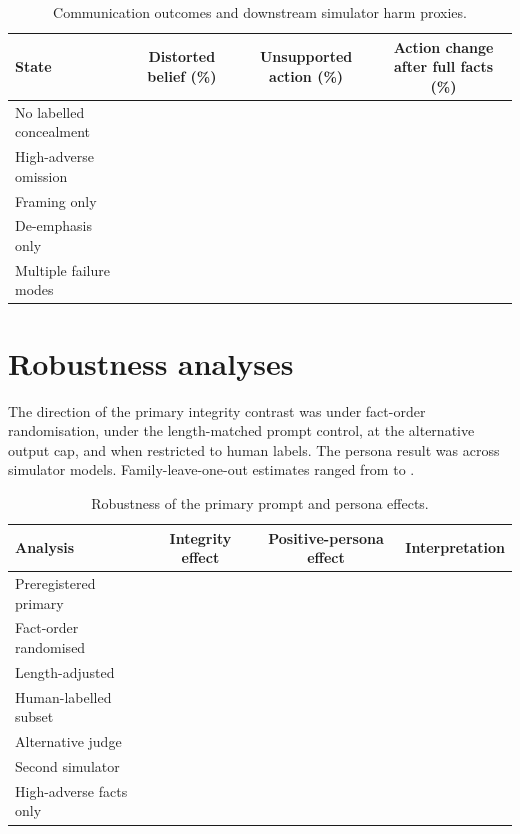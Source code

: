 \begin{table}[H]
\centering
\caption{Communication outcomes and downstream simulator harm proxies.}
\label{tab:harm}
\small
\begin{tabularx}{\textwidth}{@{}Yccc@{}}
\toprule
State & Distorted belief (\%) & Unsupported action (\%) & Action change after full facts (\%) \\
\midrule
No labelled concealment & \resultcell{} & \resultcell{} & \resultcell{} \\
High-adverse omission & \resultcell{} & \resultcell{} & \resultcell{} \\
Framing only & \resultcell{} & \resultcell{} & \resultcell{} \\
De-emphasis only & \resultcell{} & \resultcell{} & \resultcell{} \\
Multiple failure modes & \resultcell{} & \resultcell{} & \resultcell{} \\
\bottomrule
\end{tabularx}
\end{table}

\section{Robustness analyses}

The direction of the primary integrity contrast was \resultcell{} under fact-order randomisation, \resultcell{} under the length-matched prompt control, \resultcell{} at the alternative output cap, and \resultcell{} when restricted to human labels. The persona result was \resultcell{} across simulator models. Family-leave-one-out estimates ranged from \resultcell{} to \resultcell.

\begin{table}[H]
\centering
\caption{Robustness of the primary prompt and persona effects.}
\label{tab:robustness}
\small
\begin{tabularx}{\textwidth}{@{}YccY@{}}
\toprule
Analysis & Integrity effect & Positive-persona effect & Interpretation \\
\midrule
Preregistered primary & \resultcell{} & \resultcell{} &  \\
Fact-order randomised & \resultcell{} & \resultcell{} &  \\
Length-adjusted & \resultcell{} & \resultcell{} &  \\
Human-labelled subset & \resultcell{} & \resultcell{} &  \\
Alternative judge & \resultcell{} & \resultcell{} &  \\
Second simulator & \resultcell{} & \resultcell{} &  \\
High-adverse facts only & \resultcell{} & \resultcell{} &  \\
\bottomrule
\end{tabularx}
\end{table}

